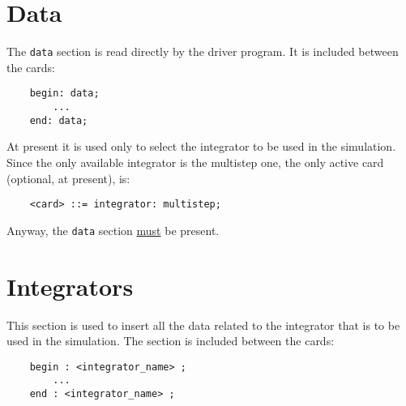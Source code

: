 %
%
%
%
%
% 
%
%

\chapter{Data}
The \texttt{data} section is read directly by the driver program. It is
included between the cards:
\begin{verbatim}
    begin: data;
        ...
    end: data;
\end{verbatim}
At present it is used only to select the integrator to be used in the
simulation. 
Since the only available integrator is the multistep one, the only active 
card (optional, at present), is:
\begin{verbatim}
    <card> ::= integrator: multistep;
\end{verbatim}
Anyway, the \texttt{data} section \underline{must} be present.





\chapter{Integrators}
This section is used to insert all the data related to the integrator that
is to be used in the simulation. The section is included between the cards:
\begin{verbatim}
    begin : <integrator_name> ;
        ...
    end : <integrator_name> ;
\end{verbatim}





